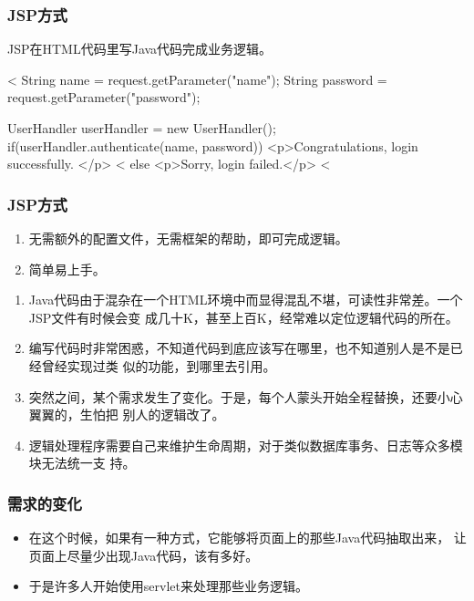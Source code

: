 \begin{frame}[fragile] %
\frametitle{JSP方式}

JSP在HTML代码里写Java代码完成业务逻辑。

\begin{xmlCode}
<%
     String name = request.getParameter("name");
     String password = request.getParameter("password");

     UserHandler userHandler = new UserHandler();
     if(userHandler.authenticate(name, password)) {
<p>Congratulations, login successfully. </p>
<%
      } else {
<p>Sorry, login failed.</p>
<%
      }
\end{xmlCode}
\end{frame}

\begin{frame}[fragile] %
\frametitle{JSP方式}

\kai
\begin{enumerate}
\item 无需额外的配置文件，无需框架的帮助，即可完成逻辑。
\item 简单易上手。
\end{enumerate}

\begin{enumerate}[<+-| alert@+>]\kai
\item Java代码由于混杂在一个HTML环境中而显得混乱不堪，可读性非常差。一个JSP文件有时候会变
  成几十K，甚至上百K，经常难以定位逻辑代码的所在。
\item 编写代码时非常困惑，不知道代码到底应该写在哪里，也不知道别人是不是已经曾经实现过类
  似的功能，到哪里去引用。
\item 突然之间，某个需求发生了变化。于是，每个人蒙头开始全程替换，还要小心翼翼的，生怕把
  别人的逻辑改了。
\item 逻辑处理程序需要自己来维护生命周期，对于类似数据库事务、日志等众多模块无法统一支
  持。
\end{enumerate}
\end{frame}

\begin{frame}[fragile] %
\frametitle{需求的变化}

\begin{itemize}
\item 在这个时候，如果有一种方式，它能够将页面上的那些Java代码抽取出来，
  让页面上尽量少出现Java代码，该有多好。
\item {\Blue\hei 于是许多人开始使用servlet来处理那些业务逻辑。 }
\end{itemize}


\end{frame}

